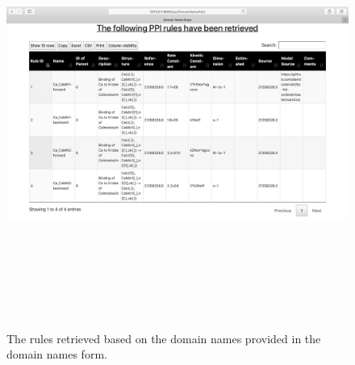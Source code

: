 \documentclass[msc,deptreport,ai]{infthesis}      %
\begin{document}
\begin{figure}[H]
	\centering
	\captionsetup{justification=centering}
	\includegraphics[width=\linewidth,height=14cm,keepaspectratio]{DomainNameRules.png}	
	\caption{The rules retrieved based on the domain names provided in the domain names form.}
	\label{fig:domainNameRules}		
\end{figure}
\end{document}
